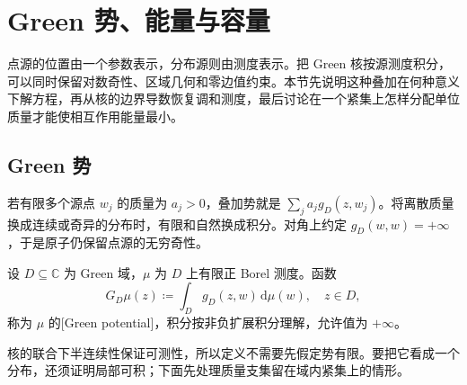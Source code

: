 \section{Green 势、能量与容量}
\label{b3:sec:1704}

点源的位置由一个参数表示，分布源则由测度表示。把 Green 核按源测度积分，可以同时保留对数奇性、区域几何和零边值约束。本节先说明这种叠加在何种意义下解方程，再从核的边界导数恢复调和测度，最后讨论在一个紧集上怎样分配单位质量才能使相互作用能量最小。

\subsection{Green 势}
\label{b3:subsec:170401}

若有限多个源点 \(w_j\) 的质量为 \(a_j>0\)，叠加势就是 \(\sum_j a_jg_D(z,w_j)\)。将离散质量换成连续或奇异的分布时，有限和自然换成积分。对角上约定 \(g_D(w,w)=+\infty\)，于是原子仍保留点源的无穷奇性。

\begin{definition}\label{b3:def:17-green-potential}
设 \(D\subseteq\mathbb C\) 为 Green 域，\(\mu\) 为 \(D\) 上有限正 Borel 测度。函数
\[
 G_D\mu(z)\coloneqq\int_Dg_D(z,w)\,\mathrm d\mu(w),
 \quad z\in D,
\]
称为 \(\mu\) 的[Green potential]，积分按非负扩展积分理解，允许值为 \(+\infty\)。
\end{definition}

核的联合下半连续性保证可测性，所以定义不需要先假定势有限。要把它看成一个分布，还须证明局部可积；下面先处理质量支集留在域内紧集上的情形。

